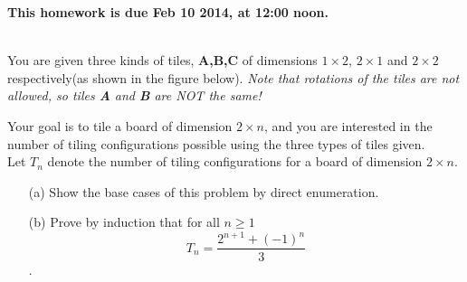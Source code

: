 \documentclass[11pt]{article}
\newif\ifsolutions
\begin{document}
\maketitle

\vspace{0.5em}
{\Large{\textbf{This homework is due Feb 10 2014, at 12:00 noon.}}}



\begin{qunlist}

 \\
You are given three kinds of tiles, \textbf{A,B,C} of dimensions $1 \times 2$, $2 \times 1$
and $2 \times 2$ respectively(as shown in the figure below).
\textit{Note that rotations of the tiles are not allowed, so tiles \textbf{A} and \textbf{B} are NOT the same!}

\begin{figure}[tile]
\centering
\end{figure}

Your goal is to tile a board of dimension $2 \times n$, and you are interested in the number of
tiling configurations possible using the three types of tiles given. \\
Let $T_n$ denote the number of tiling configurations for a board of dimension $2 \times n$.
\begin{itemize}
\item[(a)] Show the base cases of this problem by direct enumeration.

\ifsolutions
\textbf{Solutions:}
\fi


\item[(b)] Prove by induction that for all $n \geq 1$
\[ T_n = \frac{2^{n+1}+(-1)^n}{3} \]. 

\ifsolutions
\textbf{Solutions:}
\fi

\end{itemize}



%
%
%




\end{qunlist}
\end{document}
